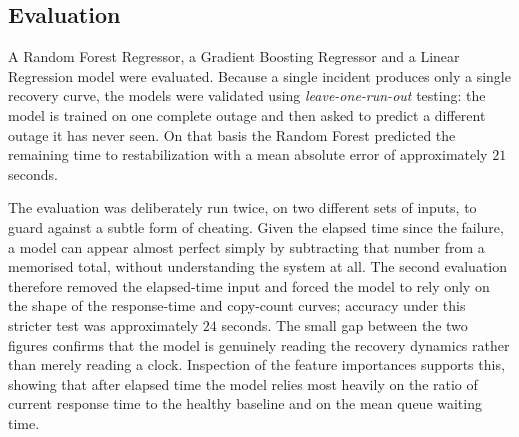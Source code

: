 \subsection{Evaluation}
A Random Forest Regressor, a Gradient Boosting Regressor and a Linear Regression
model were evaluated. Because a single incident produces only a single recovery
curve, the models were validated using \textit{leave-one-run-out} testing: the
model is trained on one complete outage and then asked to predict a different
outage it has never seen. On that basis the Random Forest predicted the remaining
time to restabilization with a mean absolute error of approximately $21$ seconds.

The evaluation was deliberately run twice, on two different sets of inputs, to
guard against a subtle form of cheating. Given the elapsed time since the
failure, a model can appear almost perfect simply by subtracting that number from
a memorised total, without understanding the system at all. The second
evaluation therefore removed the elapsed-time input and forced the model to rely
only on the shape of the response-time and copy-count curves; accuracy under
this stricter test was approximately $24$ seconds. The small gap between the two
figures confirms that the model is genuinely reading the recovery dynamics rather
than merely reading a clock. Inspection of the feature importances supports this,
showing that after elapsed time the model relies most heavily on the ratio of
current response time to the healthy baseline and on the mean queue waiting time.
